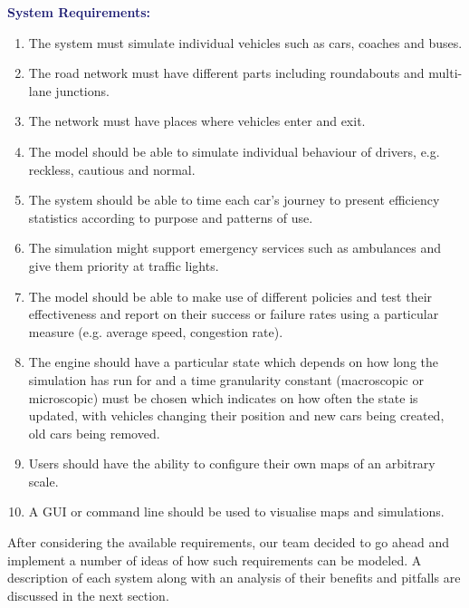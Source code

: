 \documentclass{article}
\begin{document}
{\bf\textcolor{MidnightBlue}{System Requirements:}}
\begin{enumerate}
	
	\item The system must simulate individual vehicles such as cars, coaches and buses.
	\item The road network must have different parts including roundabouts and multi-lane junctions. 
	\item The network must have places where vehicles enter and exit.
	\item The model should be able to simulate individual behaviour of drivers, e.g. reckless, cautious and normal. 
	\item The system should be able to time each car's journey to present efficiency statistics according to purpose and patterns of use. 
	\item The simulation might support emergency services such as ambulances and give them priority at traffic lights.
	\item The model should be able to make use of different policies and test their effectiveness and report on their success or failure rates using a particular measure (e.g. average speed, congestion rate).
	\item The engine should have a particular state which depends on how long the simulation has run for and a time granularity constant (macroscopic or microscopic) must be chosen which indicates on how often the state is updated, with vehicles changing their position and new cars being created, old cars being removed.  
	\item Users should have the ability to configure their own maps of an arbitrary scale. 
	\item A GUI or command line should be used to visualise maps and simulations.
\end{enumerate}

\noindent
After considering the available requirements, our team decided to go ahead and implement a number of ideas of how such requirements can be modeled. A description of each system along with an analysis of their benefits and pitfalls are discussed in the next section. 
\end{document}
